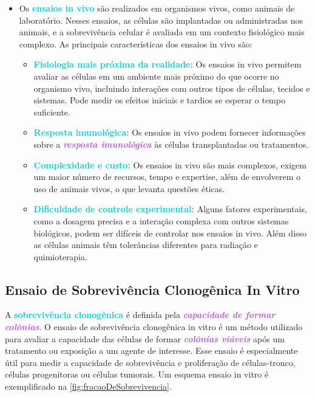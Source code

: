 \documentclass[11pt,a4paper]{article}
\begin{document}
\begin{itemize}[label=\textcolor{CarnationPink}{$\blacktriangleright$}]
		\item Os \textcolor{DarkTurquoise}{\LobsterTwo\textbf{ensaios in vivo}} são realizados em organismos vivos, como animais de laboratório. Nesses ensaios, as células são implantadas ou administradas nos animais, e a sobrevivência celular é avaliada em um contexto fisiológico mais complexo. As principais características dos ensaios in vivo são:
		\begin{itemize}[label=\textcolor{CarnationPink}{$\star$}]
			\item \textcolor{DarkTurquoise}{\textbf{Fisiologia mais próxima da realidade:}} Os ensaios in vivo permitem avaliar as células em um ambiente mais próximo do que ocorre no organismo vivo, incluindo interações com outros tipos de células, tecidos e sistemas. Pode medir os efeitos iniciais e tardios se esperar o tempo suficiente.
			\item \textcolor{DarkTurquoise}{\textbf{Resposta imunológica:}} Os ensaios in vivo podem fornecer informações sobre a \textcolor{MediumOrchid}{\textbf{\textit{resposta imunológica}}} às células transplantadas ou tratamentos.
			\item \textcolor{DarkTurquoise}{\textbf{Complexidade e custo:}} Os ensaios in vivo são mais complexos, exigem um maior número de recursos, tempo e expertise, além de envolverem o uso de animais vivos, o que levanta questões éticas.
			\item \textcolor{DarkTurquoise}{\textbf{Dificuldade de controle experimental:}} Alguns fatores experimentais, como a dosagem precisa e a interação complexa com outros sistemas biológicos, podem ser difíceis de controlar nos ensaios in vivo. Além disso as células animais têm tolerâncias diferentes para radiação e quimioterapia.
		\end{itemize}
	\end{itemize}


\subsection*{Ensaio de Sobrevivência Clonogênica In Vitro}

	A \textcolor{DarkTurquoise}{\textbf{sobrevivência clonogênica}} é definida pela \textcolor{MediumOrchid}{\textbf{\textit{capacidade de formar colônias}}}. O ensaio de sobrevivência clonogênica in vitro é um método utilizado para avaliar a capacidade das células de formar \textcolor{MediumOrchid}{\textbf{\textit{colônias viáveis}}} após um tratamento ou exposição a um agente de interesse. Esse ensaio é especialmente útil para medir a capacidade de sobrevivência e proliferação de células-tronco, células progenitoras ou células tumorais. Um esquema ensaio in vitro é exemplificado na \ref{fig:fracaoDeSobrevivencia}.
\end{document}
